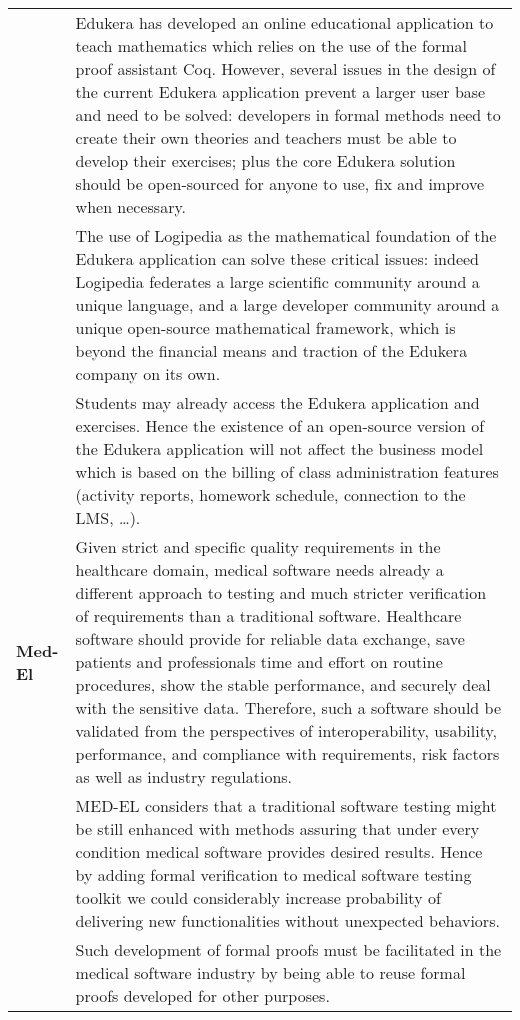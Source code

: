 \begin{longtable}{|p{}|p{}|}
&Edukera has developed an online educational application
to teach mathematics which relies on the use of the formal proof
assistant Coq. However, several issues in the design of the current
Edukera application prevent a larger user base and need to be solved:
developers in formal methods need to create their own theories and
teachers must be able to develop their exercises; plus the core
Edukera solution should be open-sourced for anyone to use, fix and
improve when necessary.  \\

&
\hspace{0.4cm} The use of Logipedia as the mathematical foundation of
the Edukera application can solve these critical issues: indeed
Logipedia federates a large scientific community around a unique
language, and a large developer community around a unique open-source
mathematical framework, which is beyond the financial means and
traction of the Edukera company on its own.  \\

&
\hspace{0.4cm} Students may already access the Edukera application and
exercises. Hence the existence of an open-source version of the
Edukera application will not affect the business model which is based
on the billing of class administration features (activity reports,
homework schedule, connection to the LMS, \ldots).  \\

\hline

{\bf Med-El}
&
Given strict and specific quality requirements in the healthcare
domain, medical software needs already a different approach to testing
and much stricter verification of requirements than a traditional
software. Healthcare software should provide for reliable data
exchange, save patients and professionals time and effort on routine
procedures, show the stable performance, and securely deal with the
sensitive data. Therefore, such a software should be validated from
the perspectives of interoperability, usability, performance, and
compliance with requirements, risk factors as well as industry
regulations.\\

&
\hspace{0.4cm}
MED-EL considers that a traditional software testing
might be still enhanced with methods assuring that under every
condition medical software provides desired results. Hence by adding
formal verification to medical software testing toolkit we could
considerably increase probability of delivering new functionalities
without unexpected behaviors.\\
&
\hspace{0.4cm}
Such development of formal proofs must be facilitated in the 
medical software industry by being able to reuse formal proofs developed
for other purposes.\\


\end{longtable}
